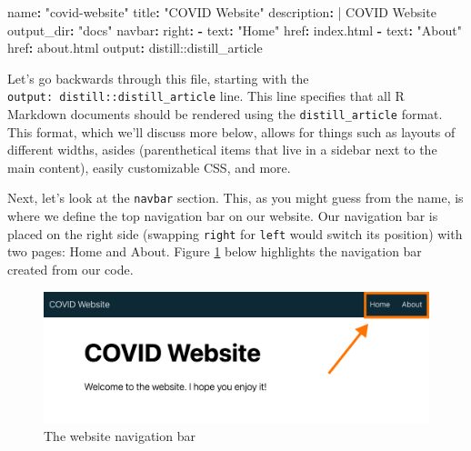 \documentclass[
]{book}
\newenvironment{Shaded}{\begin{snugshade}}{\end{snugshade}}
\newcommand{\AttributeTok}[1]{\textcolor[rgb]{0.77,0.63,0.00}{#1}}
\newcommand{\CharTok}[1]{\textcolor[rgb]{0.31,0.60,0.02}{#1}}
\newcommand{\FunctionTok}[1]{\textcolor[rgb]{0.00,0.00,0.00}{#1}}
\newcommand{\KeywordTok}[1]{\textcolor[rgb]{0.13,0.29,0.53}{\textbf{#1}}}
\newcommand{\NormalTok}[1]{#1}
\newcommand{\StringTok}[1]{\textcolor[rgb]{0.31,0.60,0.02}{#1}}
\begin{document}
\begin{Shaded}
\begin{Highlighting}[]
\FunctionTok{name}\KeywordTok{:}\AttributeTok{ }\StringTok{"covid{-}website"}
\FunctionTok{title}\KeywordTok{:}\AttributeTok{ }\StringTok{"COVID Website"}
\FunctionTok{description}\KeywordTok{: }\CharTok{|}
\NormalTok{  COVID Website}
\FunctionTok{output\_dir}\KeywordTok{:}\AttributeTok{ }\StringTok{"docs"}
\FunctionTok{navbar}\KeywordTok{:}
\AttributeTok{  }\FunctionTok{right}\KeywordTok{:}
\AttributeTok{    }\KeywordTok{{-}}\AttributeTok{ }\FunctionTok{text}\KeywordTok{:}\AttributeTok{ }\StringTok{"Home"}
\AttributeTok{      }\FunctionTok{href}\KeywordTok{:}\AttributeTok{ index.html}
\AttributeTok{    }\KeywordTok{{-}}\AttributeTok{ }\FunctionTok{text}\KeywordTok{:}\AttributeTok{ }\StringTok{"About"}
\AttributeTok{      }\FunctionTok{href}\KeywordTok{:}\AttributeTok{ about.html}
\FunctionTok{output}\KeywordTok{:}\AttributeTok{ distill::distill\_article}
\end{Highlighting}
\end{Shaded}

Let's go backwards through this file, starting with the \texttt{output:\ distill::distill\_article} line. This line specifies that all R Markdown documents should be rendered using the \texttt{distill\_article} format. This format, which we'll discuss more below, allows for things such as layouts of different widths, asides (parenthetical items that live in a sidebar next to the main content), easily customizable CSS, and more.

Next, let's look at the \texttt{navbar} section. This, as you might guess from the name, is where we define the top navigation bar on our website. Our navigation bar is placed on the right side (swapping \texttt{right} for \texttt{left} would switch its position) with two pages: Home and About. Figure \ref{fig:navbar} below highlights the navigation bar created from our code.

\begin{figure}
\includegraphics[width=1\linewidth]{assets/navbar} \caption{The website navigation bar}\label{fig:navbar}
\end{figure}
\end{document}
